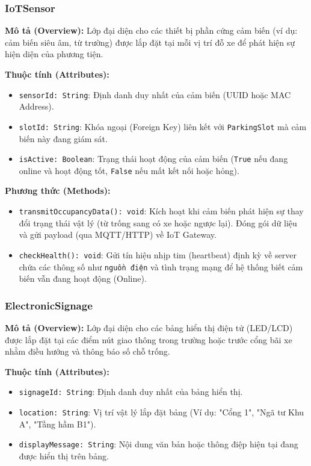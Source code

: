 \subsubsection{IoTSensor}
\textbf{Mô tả (Overview):} Lớp đại diện cho các thiết bị phần cứng cảm biến (ví dụ: cảm biến siêu âm, từ trường) được lắp đặt tại mỗi vị trí đỗ xe để phát hiện sự hiện diện của phương tiện.

\vspace{0.3cm}
\noindent\textbf{Thuộc tính (Attributes):}
\begin{itemize}
    \item \texttt{sensorId: String}: Định danh duy nhất của cảm biến (UUID hoặc MAC Address).
    \item \texttt{slotId: String}: Khóa ngoại (Foreign Key) liên kết với \texttt{ParkingSlot} mà cảm biến này đang giám sát.
    \item \texttt{isActive: Boolean}: Trạng thái hoạt động của cảm biến (\texttt{True} nếu đang online và hoạt động tốt, \texttt{False} nếu mất kết nối hoặc hỏng).
\end{itemize}

\noindent\textbf{Phương thức (Methods):}
\begin{itemize}
    \item \texttt{transmitOccupancyData(): void}: Kích hoạt khi cảm biến phát hiện sự thay đổi trạng thái vật lý (từ trống sang có xe hoặc ngược lại). Đóng gói dữ liệu và gửi payload (qua MQTT/HTTP) về IoT Gateway.
    \item \texttt{checkHealth(): void}: Gửi tín hiệu nhịp tim (heartbeat) định kỳ về server chứa các thông số như \texttt{nguồn điện} và tình trạng mạng để hệ thống biết cảm biến vẫn đang hoạt động (Online).
\end{itemize}


\subsubsection{ElectronicSignage}
\textbf{Mô tả (Overview):} Lớp đại diện cho các bảng hiển thị điện tử (LED/LCD) được lắp đặt tại các điểm nút giao thông trong trường hoặc trước cổng bãi xe nhằm điều hướng và thông báo số chỗ trống.

\vspace{0.3cm}
\noindent\textbf{Thuộc tính (Attributes):}
\begin{itemize}
    \item \texttt{signageId: String}: Định danh duy nhất của bảng hiển thị.
    \item \texttt{location: String}: Vị trí vật lý lắp đặt bảng (Ví dụ: "Cổng 1", "Ngã tư Khu A", "Tầng hầm B1").
    \item \texttt{displayMessage: String}: Nội dung văn bản hoặc thông điệp hiện tại đang được hiển thị trên bảng.
\end{itemize}

